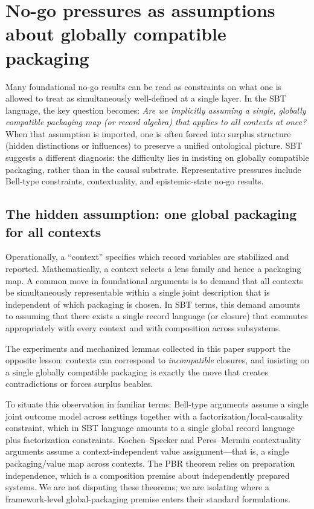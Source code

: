 \section{No-go pressures as assumptions about globally compatible packaging}\label{sec:no-go}

Many foundational no-go results can be read as constraints on what one is allowed to treat as simultaneously well-defined at a single layer.
In the SBT language, the key question becomes:
\emph{Are we implicitly assuming a single, globally compatible packaging map (or record algebra) that applies to all contexts at once?}
When that assumption is imported, one is often forced into surplus structure (hidden distinctions or influences) to preserve a unified ontological picture.
SBT suggests a different diagnosis: the difficulty lies in insisting on globally compatible packaging, rather than in the causal substrate.
Representative pressures include Bell-type constraints, contextuality, and epistemic-state no-go results.\cite{Bell1964,KochenSpecker1967,Mermin1990,Pusey2012PBR}

\subsection{The hidden assumption: one global packaging for all contexts}

Operationally, a ``context'' specifies which record variables are stabilized and reported.
Mathematically, a context selects a lens family and hence a packaging map.
A common move in foundational arguments is to demand that all contexts be simultaneously representable within a single joint description that is independent of which packaging is chosen.
In SBT terms, this demand amounts to assuming that there exists a single record language (or closure) that commutes appropriately with every context and with composition across subsystems.

The experiments and mechanized lemmas collected in this paper support the opposite lesson:
contexts can correspond to \emph{incompatible} closures, and insisting on a single globally compatible packaging is exactly the move that creates contradictions or forces surplus beables.

To situate this observation in familiar terms: Bell-type arguments assume a single joint outcome model across settings together with a factorization/local-causality constraint, which in SBT language amounts to a single global record language plus factorization constraints. Kochen--Specker and Peres--Mermin contextuality arguments assume a context-independent value assignment---that is, a single packaging/value map across contexts. The PBR theorem relies on preparation independence, which is a composition premise about independently prepared systems. We are not disputing these theorems; we are isolating where a framework-level global-packaging premise enters their standard formulations.

